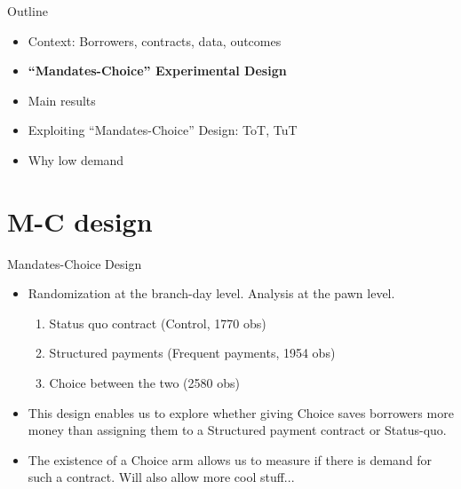 \documentclass[9pt, aspectratio=169]{beamer}
\begin{document}
\begin{frame}{Outline}
     \large   
     \begin{itemize}
        \item Context: Borrowers, contracts, data, outcomes
         \item \vfill \textbf{``Mandates-Choice'' Experimental Design}
         \vfill\item Main results
          \vfill\item Exploiting ``Mandates-Choice'' Design: ToT, TuT
         \vfill\item Why low demand
         
     \end{itemize}
\end{frame}




\section{M-C design}



\begin{frame}{Mandates-Choice Design}
\label{treatment_arms}
   \begin{itemize}
    \vfill \item Randomization at the branch-day level.  Analysis at the pawn level.
    \begin{enumerate}
        \vfill \item Status quo contract (Control, 1770 obs)
       \vfill \item Structured payments (Frequent payments, 1954 obs)
       \vfill \item Choice between the two (2580 obs)
    \end{enumerate}
       \vfill \item  This design enables us to explore whether giving Choice saves borrowers more money than assigning them to a Structured payment contract or Status-quo.
       \vfill \item The existence of a Choice arm allows us to measure if there is demand for such a contract. Will also allow more cool stuff... 
\end{itemize}
\end{frame}
\end{document}
